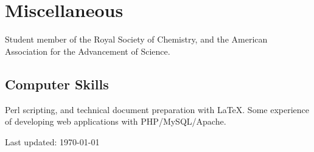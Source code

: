 \documentclass[letterpaper]{article}
\renewenvironment{itemize}{
  \begin{list}{}{
    \setlength{\leftmargin}{1.5em}
  }
}{
  \end{list}
}
\begin{document}


\section*{Miscellaneous}

Student member of the Royal Society of Chemistry, and the American Association for the Advancement of Science.

\subsection*{Computer Skills}
Perl scripting, and technical document preparation with \LaTeX. Some experience of developing web applications with PHP/MySQL/Apache. 



\bigskip

\begin{center}
\begin{footnotesize}
Last updated: \today \\
\end{footnotesize}
\end{center}
\end{document}
